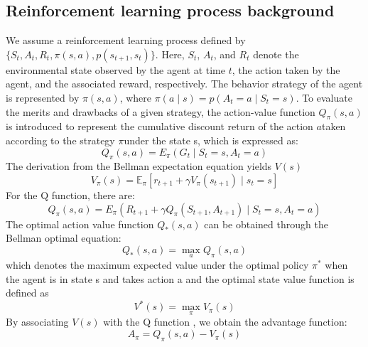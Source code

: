 \documentclass[sn-mathphys]{sn-jnl}%
\theoremstyle{thmstyleone}%
\theoremstyle{thmstyletwo}%
\theoremstyle{thmstylethree}%
\begin{document}
\subsection{Reinforcement learning process background}\label{subsec2}
We assume a reinforcement learning process defined by $\{S_t, A_t, R_t, \pi(s,a), p(s_{t+1}, s_t) \}$. Here, $S_t$, $A_t$, and $R_t$ denote the environmental state observed by the agent at time $t$, the action taken by the agent, and the associated reward, respectively. The behavior strategy of the agent is represented by $\pi(s,a)$, where $\pi(a \mid s)=p(A_t=a \mid S_t=s)$. To evaluate the merits and drawbacks of a given strategy, the action-value function $Q_{\pi}(s,a)$ is introduced to represent the cumulative discount return of the action $a $taken according to the strategy $\pi $under the state s, which is expressed as:
\begin{equation}
Q_{\pi}(s,a)=E_{\pi}(G_t \mid S_t=s,A_t=a)
\end{equation}
The derivation from the Bellman expectation equation yields $ V(s) $
\begin{equation}
V_{\pi}(s)=\mathbb{E}_{\pi}\left[r_{t+1}+\gamma V_{\pi}\left(s_{t+1}\right) \mid s_{t}=s\right] 
\end{equation}
For the Q function, there are:
\begin{equation}
Q_{\pi}(s,a)=E_{\pi}(R_{t+1}+\gamma Q_{\pi}(S_{t+1},A_{t+1}) \mid S_t=s,A_t=a)
\end{equation}
The optimal action value function $ Q_*(s,a) $ can be obtained through the Bellman optimal equation:
\begin{equation}
Q_*(s,a)=\max _{a}Q_{\pi}(s,a)
\end{equation}
which denotes the maximum expected value under the optimal policy $ \pi^* $ when the agent is in state s and takes action a
and the optimal state value function is defined as
\begin{equation}
V^{*}(s)=\max _{\pi} V_{\pi}(s)
\end{equation}
By associating $ V(s) $ with the Q function \cite{wangDuelingNetworkArchitectures2016}, we obtain the advantage function:
\begin{equation}
A_{\pi}=Q_{\pi}(s,a)-V_{\pi}(s)
\end{equation}
\end{document}
